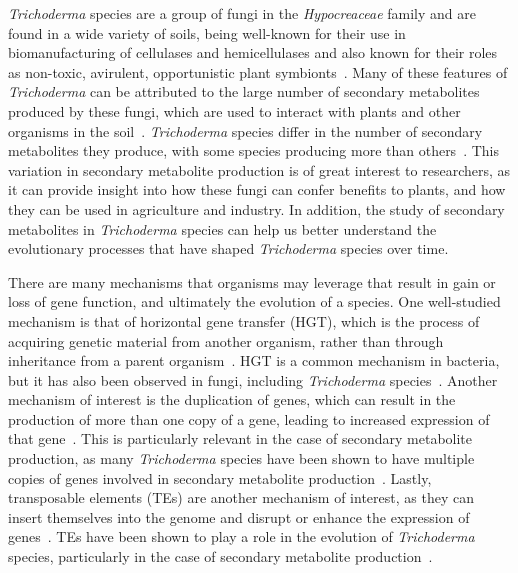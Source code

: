 \textit{Trichoderma} species are a group of fungi in the \textit{Hypocreaceae}
family and are found in a wide variety of soils, being well-known for
their use in biomanufacturing of cellulases and hemicellulases and
also known for their roles as non-toxic, avirulent, opportunistic
plant symbionts~\cite{woo2023a, kubicek2019a}.  Many of these features
of \textit{Trichoderma} can be attributed to the large number of
secondary metabolites produced by these fungi, which are used to
interact with plants and other organisms in the
soil~\cite{Mukherjee2012}. \textit{Trichoderma} species differ in the
number of secondary metabolites they produce, with some species
producing more than others~\cite{Mukherjee2012}. This variation in
secondary metabolite production is of great interest to researchers,
as it can provide insight into how these fungi can confer benefits to
plants, and how they can be used in agriculture and industry. In
addition, the study of secondary metabolites in \textit{Trichoderma}
species can help us better understand the evolutionary processes that
have shaped \textit{Trichoderma} species over time.

There are many mechanisms that organisms may leverage that result in
gain or loss of gene function, and ultimately the evolution of a
species. One well-studied mechanism is that of horizontal gene
transfer (HGT), which is the process of acquiring genetic material
from another organism, rather than through inheritance from a parent
organism~\cite{goncalves2024}. HGT is a common mechanism in bacteria,
but it has also been observed in fungi, including \textit{Trichoderma}
species~\cite{goncalves2024}. Another mechanism of interest is the
duplication of genes, which can result in the production of more than
one copy of a gene, leading to increased expression of that
gene~\cite{goncalves2024}. This is particularly relevant in the case
of secondary metabolite production, as many \textit{Trichoderma}
species have been shown to have multiple copies of genes involved in
secondary metabolite production~\cite{Mukherjee2012}. Lastly,
transposable elements (TEs) are another mechanism of interest, as they
can insert themselves into the genome and disrupt or enhance the
expression of genes~\cite{goncalves2024}. TEs have been shown to play
a role in the evolution of \textit{Trichoderma} species, particularly
in the case of secondary metabolite production~\cite{goncalves2024}.


